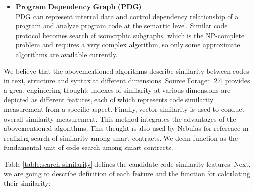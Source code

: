 \begin{itemize}
	\item \textbf{Program Dependency Graph (PDG)} \\
	PDG \cite{ferrante1987program} can represent internal data and control dependency relationship of a program and analyze program code at the semantic level. Similar code protocol becomes search of isomorphic subgraphs, which is the NP-complete problem and requires a very complex algorithm, so only some approximate algorithms are available currently.


\end{itemize}

We believe that the abovementioned algorithms describe similarity between codes in text, structure and syntax at different dimensions. Source Forager [27] provides a great engineering thought: Indexes of similarity at various dimensions are depicted as different features, each of which represents code similarity measurement from a specific aspect. Finally, vector similarity is used to conduct overall similarity measurement. This method integrates the advantages of the abovementioned algorithms. This thought is also used by Nebulas for reference in realizing search of similarity among smart contracts. We deem function as the fundamental unit of code search among smart contracts.


Table \ref{table:search-similarity} defines the candidate code similarity features. Next, we are going to describe definition of each feature and the function for calculating their similarity:



